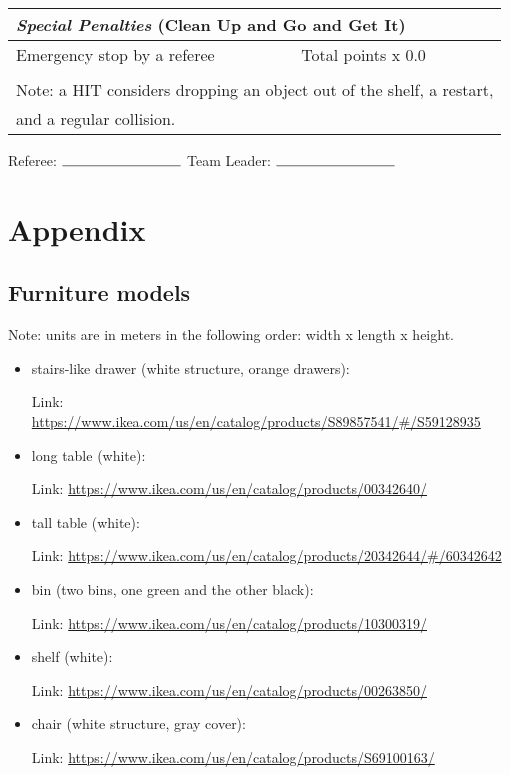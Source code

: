 \documentclass{article}
\begin{document}
\begin{center}
\begin{tabular}{ |m{8cm}|m{3cm}|m{1cm}| } 
    \hline
    \multicolumn{3}{|l|}{\textbf{\textit{Special Penalties}}  (Clean Up and Go and Get It)} \\ 
    \hline
    Emergency stop by a referee & Total points x 0.0 & \\
    \hline
    \multicolumn{3}{|l|}{}\\
    \hline
    \multicolumn{3}{|l|}{Note: a HIT considers dropping an object out of the shelf, a restart,} \\
    \multicolumn{3}{|l|}{and a regular collision.} \\ 
    \hline
\end{tabular}
\end{center}

\begin{center} Referee: $\rule{3cm}{0.15mm}$ Team Leader: $\rule{3cm}{0.15mm}$ \end{center}

\clearpage
\section{Appendix}
\subsection{Furniture models} \label{sec:furniture}

Note: units are in meters in the following order:  width x length x height.

\begin{itemize}
    \item stairs-like drawer (white structure, orange drawers):
    
    Link: \url{https://www.ikea.com/us/en/catalog/products/S89857541/#/S59128935}

    \item long table (white):

    Link: \url{https://www.ikea.com/us/en/catalog/products/00342640/}

    \item tall table (white):

    Link: \url{https://www.ikea.com/us/en/catalog/products/20342644/#/60342642}

    \item bin (two bins, one green and the other black):

    Link: \url{https://www.ikea.com/us/en/catalog/products/10300319/}

    \item  shelf (white):

    Link: \url{https://www.ikea.com/us/en/catalog/products/00263850/}

    \item chair (white structure, gray cover):

    Link: \url{https://www.ikea.com/us/en/catalog/products/S69100163/}
\end{itemize}
\end{document}
